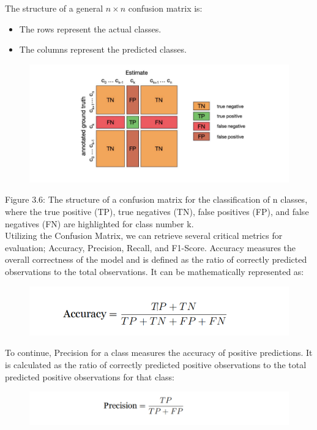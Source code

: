 \documentclass[a4paper,12pt]{article}
\begin{document}
The structure of a general $n \times n$ confusion matrix is:
\begin{itemize}
    \item The rows represent the actual classes.
    \item The columns represent the predicted classes.
\end{itemize}

\begin{figure}[H]
    \centering
    \includegraphics[width=1\linewidth]{confusion_matrix.png}
\end{figure}

Figure 3.6: The structure of a confusion matrix for the classification of n classes, where the true positive (TP), true negatives (TN), false positives (FP), and false negatives (FN) are highlighted for class number k.\\


Utilizing the Confusion Matrix, we can retrieve several critical metrics for evaluation; Accuracy, Precision, Recall, and F1-Score. Accuracy measures the overall correctness of the model and is defined as the ratio of correctly predicted observations to the total observations. It can be mathematically represented as:
\begin{figure}[H]
    \centering
    \includegraphics[width=.8\linewidth]{accuracy.png}
\end{figure}

To continue, Precision for a class measures the accuracy of positive predictions. It is calculated as the ratio of correctly predicted positive observations to the total predicted positive observations for that class:
\begin{figure}[H]
    \centering
    \includegraphics[width=1\linewidth]{Precision.png}
\end{figure}
\end{document}
